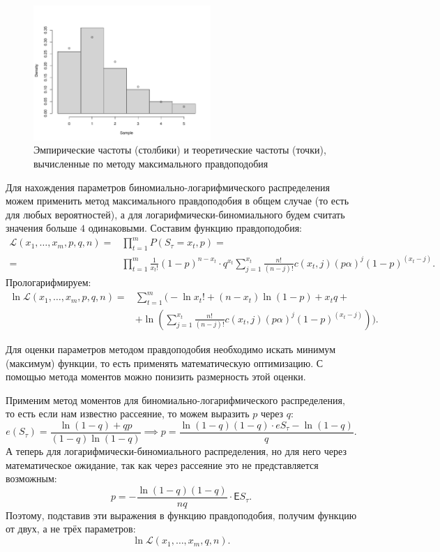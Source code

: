 \documentclass[12pt, specialist, subf, substylefile = spbu_report.rtx]{disser}
\begin{document}
	\label{MMP}
	
	\begin{figure}[ht]
		\centering
		\includegraphics[width = 0.6\textwidth]{binlogexpprob}
		\caption{Эмпирические частоты (столбики) и теоретические частоты (точки), вычисленные по методу максимального правдоподобия}
		\label{img:binlogexpprob}
	\end{figure}
	
	Для нахождения параметров биномиально-логарифмического распределения можем применить метод максимального правдоподобия в общем случае (то есть для любых вероятностей), а для логарифмически-биномиального будем считать значения больше $ 4 $ одинаковыми. Составим функцию правдоподобия:
	\[
		\begin{aligned}
			\mathcal{L} (x _1, \dots, x _m, p, q, n) =& \prod \limits ^m _{t = 1} P(S _\tau = x _t, p) =\\
			=& \prod \limits ^m _{t = 1} \frac 1 {x _t!} (1 - p) ^{n - x _t} \cdot q ^{x _t} \sum \limits ^{x _t} _{j = 1} \frac {n!} {(n - j)!} c(x _t, j) (p \alpha) ^j (1 - p) ^{(x _t - j)}.
		\end{aligned}
	\] 
	Прологарифмируем:
	\[
		\begin{aligned}
			\ln \mathcal{L} (x _1, \dots, x _m, p, q, n) =& \sum \limits ^m _{t = 1} \Bigg( -\ln x _t! + (n - x _t) \ln (1 - p) + x _t q +\\
			&+ \ln \left( \sum \limits ^{x _t} _{j = 1} \frac {n!} {(n - j)!} c(x _t, j) (p \alpha) ^j (1 - p) ^{(x _t - j)} \right) \Bigg).
		\end{aligned}
	\]
	
	Для оценки параметров методом правдоподобия необходимо искать минимум (максимум)  функции, то есть применять математическую оптимизацию. С помощью метода моментов можно понизить размерность этой оценки.
	
	Применим метод моментов для биномиально-логарифмического распределения, то есть если нам известно рассеяние, то можем выразить $ p $ через $ q $:
	\[ e (S _\tau)=\frac{\ln(1 - q) + q p}{(1-q)\ln(1 - q)} \implies p = \frac {\ln(1 - q) (1 - q) \cdot eS _\tau - \ln(1 - q)} {q}. \]
	А теперь для логарифмически-биномиального распределения, но для него через математическое ожидание, так как через рассеяние это не представляется возможным:
	\[ p = -\frac {\ln(1 - q)(1 - q)} {nq} \cdot \mathsf{E} S _\tau. \]
	Поэтому, подставив эти выражения в функцию правдоподобия, получим функцию от двух, а не трёх параметров:
	\[ \ln \mathcal{L} (x _1, \dots, x _m, q, n). \]
	
\end{document}
